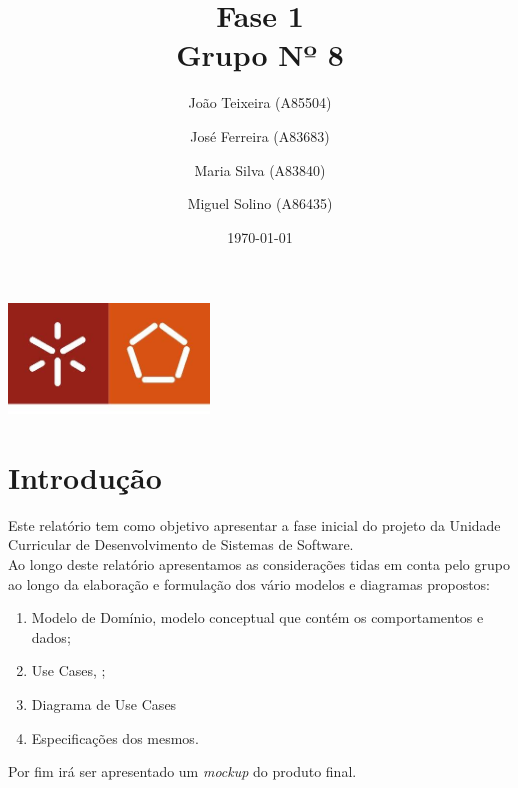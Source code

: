 \documentclass[a4paper]{report}
\begin{document}
\title{Fase 1\\ 
\large Grupo Nº 8}
\author{João Teixeira (A85504) \and José Ferreira (A83683) \and Maria Silva (A83840) \and Miguel Solino (A86435)}

\date{\today}

\begin{center}
    \begin{minipage}{0.75\linewidth}
        \centering
        \includegraphics[width=0.4\textwidth]{images/eng.jpeg}\par\vspace{1cm}
        \vspace{1.5cm}
        \href{https://www.uminho.pt/PT}
        {\color{black}{\scshape\LARGE Universidade do Minho}} \par
        \vspace{1cm}
        \href{https://www.di.uminho.pt/}
        {\color{black}{\scshape\Large Departamento de Informática}} \par
        \vspace{1.5cm}
        \maketitle
    \end{minipage}
\end{center}

\tableofcontents

\pagebreak

\chapter{Introdução}

Este relatório tem como objetivo apresentar a fase inicial do projeto da Unidade
Curricular de Desenvolvimento de Sistemas de Software.\\
Ao longo deste relatório apresentamos as considerações tidas em conta pelo grupo
ao longo da elaboração e formulação dos vário modelos e diagramas propostos:
\begin{enumerate}
    \item Modelo de Domínio, modelo conceptual que contém os
        comportamentos e dados;
    \item Use Cases, ;
    \item Diagrama de Use Cases
    \item Especificações dos mesmos.
\end{enumerate}
Por fim irá ser apresentado um \textit{mockup} do produto final.
\end{document}
